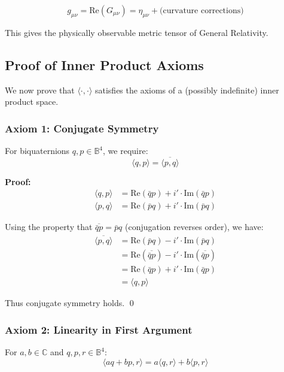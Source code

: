 \begin{equation}
g_{\mu\nu} = \text{Re}(G_{\mu\nu}) = \eta_{\mu\nu} + \text{(curvature corrections)}
\end{equation}

This gives the physically observable metric tensor of General Relativity.

\subsection{Proof of Inner Product Axioms}

We now prove that $\langle \cdot, \cdot \rangle$ satisfies the axioms of a (possibly indefinite) inner product space.

\subsubsection{Axiom 1: Conjugate Symmetry}

For biquaternions $q, p \in \mathbb{B}^4$, we require:
\begin{equation}
\langle q, p \rangle = \overline{\langle p, q \rangle}
\end{equation}

\textbf{Proof:}
\begin{align}
\langle q, p \rangle &= \text{Re}(\bar{q} p) + i' \cdot \text{Im}(\bar{q} p) \\
\langle p, q \rangle &= \text{Re}(\bar{p} q) + i' \cdot \text{Im}(\bar{p} q)
\end{align}

Using the property that $\overline{\bar{q} p} = \bar{p} q$ (conjugation reverses order), we have:
\begin{align}
\overline{\langle p, q \rangle} &= \text{Re}(\bar{p} q) - i' \cdot \text{Im}(\bar{p} q) \\
&= \text{Re}(\overline{\bar{q} p}) - i' \cdot \text{Im}(\overline{\bar{q} p}) \\
&= \text{Re}(\bar{q} p) + i' \cdot \text{Im}(\bar{q} p) \\
&= \langle q, p \rangle
\end{align}

Thus conjugate symmetry holds. \qed

\subsubsection{Axiom 2: Linearity in First Argument}

For $a, b \in \mathbb{C}$ and $q, p, r \in \mathbb{B}^4$:
\begin{equation}
\langle aq + bp, r \rangle = a \langle q, r \rangle + b \langle p, r \rangle
\end{equation}

